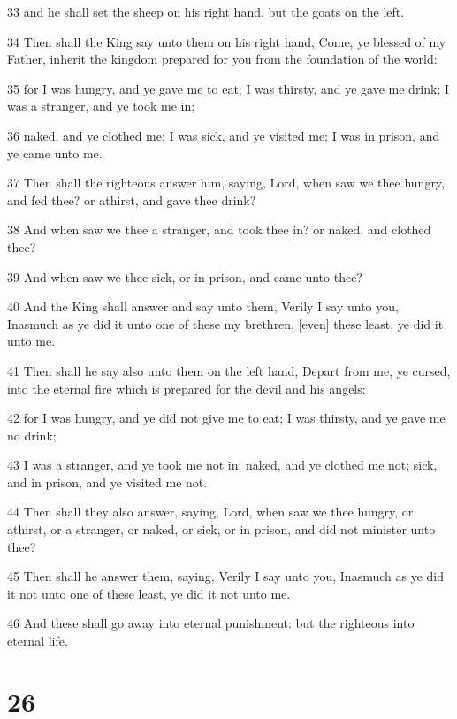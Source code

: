 \par 33 and he shall set the sheep on his right hand, but the goats on the left.
\par 34 Then shall the King say unto them on his right hand, Come, ye blessed of my Father, inherit the kingdom prepared for you from the foundation of the world:
\par 35 for I was hungry, and ye gave me to eat; I was thirsty, and ye gave me drink; I was a stranger, and ye took me in;
\par 36 naked, and ye clothed me; I was sick, and ye visited me; I was in prison, and ye came unto me.
\par 37 Then shall the righteous answer him, saying, Lord, when saw we thee hungry, and fed thee? or athirst, and gave thee drink?
\par 38 And when saw we thee a stranger, and took thee in? or naked, and clothed thee?
\par 39 And when saw we thee sick, or in prison, and came unto thee?
\par 40 And the King shall answer and say unto them, Verily I say unto you, Inasmuch as ye did it unto one of these my brethren, [even] these least, ye did it unto me.
\par 41 Then shall he say also unto them on the left hand, Depart from me, ye cursed, into the eternal fire which is prepared for the devil and his angels:
\par 42 for I was hungry, and ye did not give me to eat; I was thirsty, and ye gave me no drink;
\par 43 I was a stranger, and ye took me not in; naked, and ye clothed me not; sick, and in prison, and ye visited me not.
\par 44 Then shall they also answer, saying, Lord, when saw we thee hungry, or athirst, or a stranger, or naked, or sick, or in prison, and did not minister unto thee?
\par 45 Then shall he answer them, saying, Verily I say unto you, Inasmuch as ye did it not unto one of these least, ye did it not unto me.
\par 46 And these shall go away into eternal punishment: but the righteous into eternal life.

\chapter{26}

